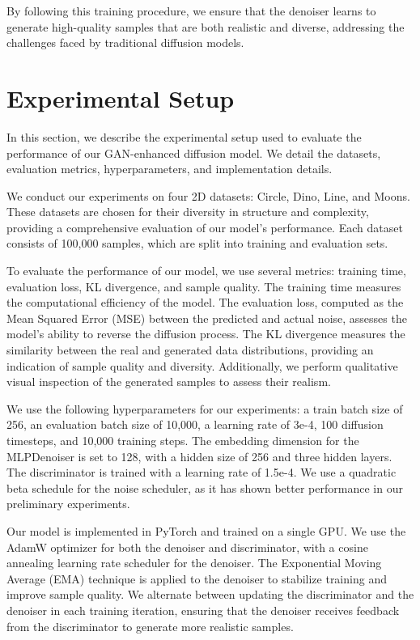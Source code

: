 \documentclass{article} %
\begin{document}
By following this training procedure, we ensure that the denoiser learns to generate high-quality samples that are both realistic and diverse, addressing the challenges faced by traditional diffusion models.

\section{Experimental Setup}
\label{sec:experimental}

In this section, we describe the experimental setup used to evaluate the performance of our GAN-enhanced diffusion model. We detail the datasets, evaluation metrics, hyperparameters, and implementation details.

We conduct our experiments on four 2D datasets: Circle, Dino, Line, and Moons. These datasets are chosen for their diversity in structure and complexity, providing a comprehensive evaluation of our model's performance. Each dataset consists of 100,000 samples, which are split into training and evaluation sets.

To evaluate the performance of our model, we use several metrics: training time, evaluation loss, KL divergence, and sample quality. The training time measures the computational efficiency of the model. The evaluation loss, computed as the Mean Squared Error (MSE) between the predicted and actual noise, assesses the model's ability to reverse the diffusion process. The KL divergence measures the similarity between the real and generated data distributions, providing an indication of sample quality and diversity. Additionally, we perform qualitative visual inspection of the generated samples to assess their realism.

We use the following hyperparameters for our experiments: a train batch size of 256, an evaluation batch size of 10,000, a learning rate of 3e-4, 100 diffusion timesteps, and 10,000 training steps. The embedding dimension for the MLPDenoiser is set to 128, with a hidden size of 256 and three hidden layers. The discriminator is trained with a learning rate of 1.5e-4. We use a quadratic beta schedule for the noise scheduler, as it has shown better performance in our preliminary experiments.

Our model is implemented in PyTorch and trained on a single GPU. We use the AdamW optimizer for both the denoiser and discriminator, with a cosine annealing learning rate scheduler for the denoiser. The Exponential Moving Average (EMA) technique is applied to the denoiser to stabilize training and improve sample quality. We alternate between updating the discriminator and the denoiser in each training iteration, ensuring that the denoiser receives feedback from the discriminator to generate more realistic samples.
\end{document}
